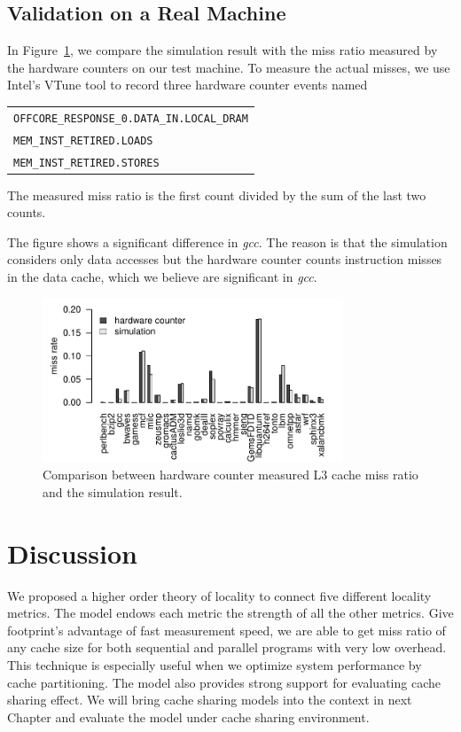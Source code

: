 \subsection{Validation on a Real Machine}

In Figure~\ref{fig:counter}, we compare the simulation result with the
miss ratio measured by the hardware counters on our test machine. To
measure the actual misses, we use Intel's VTune tool to record three
hardware counter events named 

\medskip
\begin{tabular}{l}
\texttt{OFFCORE\_RESPONSE\_0.DATA\_IN.LOCAL\_DRAM} \\
\texttt{MEM\_INST\_RETIRED.LOADS} \\
\texttt{MEM\_INST\_RETIRED.STORES} \\
\end{tabular}
\smallskip

\noindent The measured miss ratio is the first count
divided by the sum of the last two counts.

The figure shows a significant difference in \emph{gcc}.  The reason
is that the simulation considers only data accesses but the hardware
counter counts instruction misses in the data cache, which we believe are significant in
\emph{gcc}.  

\begin{figure}[h!]
  \centering
  \includegraphics[width=0.8\textwidth]{figures/model/hwc_sim}
  \caption{Comparison between hardware counter measured L3 cache miss
    ratio and the simulation result.}
  \label{fig:counter}
\end{figure} 


\section{Discussion}
\label{sec:model_sum}
We proposed a higher order theory of locality to connect five
different locality metrics. The model endows each metric the strength
of all the other metrics. Give footprint's advantage of fast
measurement speed, we are able to get miss ratio of any cache size for
both sequential and parallel programs with very low overhead. This
technique is especially useful when we optimize system performance by
cache partitioning. The model also provides strong support for
evaluating cache sharing effect. We will bring cache sharing models
into the context in next Chapter and evaluate the model under cache
sharing environment. 
